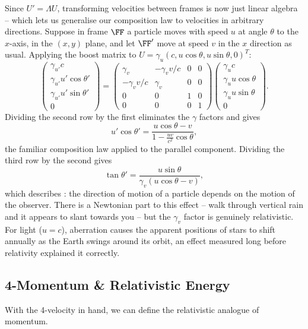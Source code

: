 \documentclass[a4paper]{scrartcl}
\begin{document}
Since $U' = \Lambda U$, transforming velocities between frames is now just linear algebra -- which lets us generalise our composition law to velocities in arbitrary directions. Suppose in frame $\FF$ a particle moves with speed $u$ at angle $\theta$ to the $x$-axis, in the $(x,y)$ plane, and let $\FF'$ move at speed $v$ in the $x$ direction as usual. Applying the boost matrix to $U = \gamma_u(c, u\cos\theta, u \sin\theta, 0)^T$:
$$
\begin{pmatrix}
	\gamma_{u'} c \\ \gamma_{u'} u' \cos\theta' \\ \gamma_{u'} u' \sin \theta' \\ 0
\end{pmatrix} = \begin{pmatrix}
	\gamma_v & -\gamma_v v/c & 0 & 0 \\
	-\gamma_v v/c & \gamma_v & 0 & 0 \\
	0 & 0 & 1 & 0 \\
	0 & 0 & 0 & 1
\end{pmatrix}\begin{pmatrix}
	\gamma_u c \\ \gamma_u u \cos\theta \\ \gamma_u u \sin\theta \\ 0
\end{pmatrix}.
$$
Dividing the second row by the first eliminates the $\gamma$ factors and gives
$$
u' \cos \theta' = \frac{u \cos\theta - v}{1 - \frac{uv}{c^2}\cos\theta},
$$
the familiar composition law applied to the parallel component. Dividing the third row by the second gives
$$
\tan \theta' = \frac{u \sin \theta}{\gamma_v (u \cos\theta - v)},
$$
which describes : the direction of motion of a particle depends on the motion of the observer. There is a Newtonian part to this effect -- walk through vertical rain and it appears to slant towards you -- but the $\gamma_v$ factor is genuinely relativistic. For light ($u = c$), aberration causes the apparent positions of stars to shift annually as the Earth swings around its orbit, an effect measured long before relativity explained it correctly.

\subsection{4-Momentum \& Relativistic Energy}

With the 4-velocity in hand, we can define the relativistic analogue of momentum.
\end{document}
